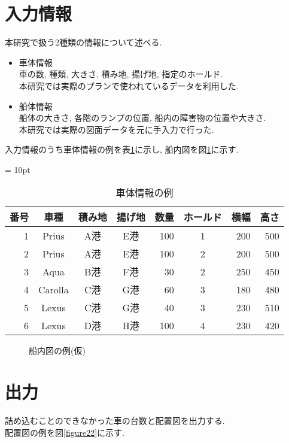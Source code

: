 \section{入力情報}
本研究で扱う2種類の情報について述べる. 

\begin{itemize}
    \item 車体情報 \\
    車の数, 種類, 大きさ, 積み地, 揚げ地, 指定のホールド. \\
    本研究では実際のプランで使われているデータを利用した. 
    \item 船体情報 \\
    船体の大きさ, 各階のランプの位置, 船内の障害物の位置や大きさ. \\
    本研究では実際の図面データを元に手入力で行った. 

\end{itemize}
入力情報のうち車体情報の例を表\ref{table21}に示し, 船内図を図\ref{figure21}に示す. 

\begin{table}[htbp]
    \tabcolsep = 10pt
    \caption{車体情報の例}
    \label{table21}
    \begin{center}
    \begin{tabular}{rcccrcrr} \hline
    番号 & 車種 & 積み地 & 揚げ地 & 数量 & ホールド & 横幅 & 高さ \\ \hline
    1 & Prius & A港 & E港 & 100 & 1 & 200 & 500 \\
    2 & Prius & A港 & E港 & 100 & 2 & 200 & 500 \\
    3 & Aqua & B港 & F港 & 30 & 2 & 250 & 450 \\
    4 & Carolla & C港 & G港 & 60 & 3 & 180 & 480 \\
    5 & Lexus & C港 & G港 & 40 & 3 & 230 & 510 \\
    6 & Lexus & D港 & H港 & 100 & 4 & 230 & 420 \\
    \hline
    \end{tabular}
    \end{center}
    \end{table}

\begin{figure}[H]
    \centering
    \caption{船内図の例(仮)}
    \label{figure21}
\end{figure}

\section{出力}
詰め込むことのできなかった車の台数と配置図を出力する. \\
配置図の例を図\ref{figure22}に示す. 

